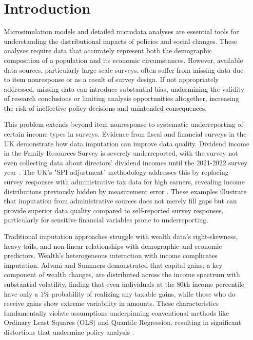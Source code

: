 \section{Introduction}

Microsimulation models and detailed microdata analyses are essential tools for understanding the distributional impacts of policies and social changes. These analyses require data that accurately represent both the demographic composition of a population and its economic circumstances. However, available data sources, particularly large-scale surveys, often suffer from missing data due to item nonresponse \citep{dempster1983introduction} or as a result of survey design. If not appropriately addressed, missing data can introduce substantial bias, undermining the validity of research conclusions \citep{graham2009missing} or limiting analysis opportunities altogether, increasing the risk of ineffective policy decisions and unintended consequences.

This problem extends beyond item nonresponse to systematic underreporting of certain income types in surveys. Evidence from fiscal and financial surveys in the UK demonstrate how data imputation can improve data quality. Dividend income in the Family Resources Survey is severely underreported, with the survey not even collecting data about directors' dividend incomes until the 2021-2022 survey year \citep{dwp2023frs}. The UK's "SPI adjustment" methodology addresses this by replacing survey responses with administrative tax data for high earners, revealing income distributions previously hidden by measurement error \citep{advani2023measuring}. These examples illustrate that imputation from administrative sources does not merely fill gaps but can provide superior data quality compared to self-reported survey responses, particularly for sensitive financial variables prone to underreporting.

Traditional imputation approaches struggle with wealth data's right-skewness, heavy tails, and non-linear relationships with demographic and economic predictors. Wealth's heterogeneous interaction with income complicates imputation. Advani and Summers \citep{advani2020capital} demonstrated that capital gains, a key component of wealth changes, are distributed across the income spectrum with substantial volatility, finding that even individuals at the 80th income percentile have only a 1\% probability of realizing any taxable gains, while those who do receive gains show extreme variability in amounts. These characteristics fundamentally violate assumptions underpinning conventional methods like Ordinary Least Squares (OLS) and Quantile Regression, resulting in significant distortions that undermine policy analysis \citep{meinshausen2006quantile}.


